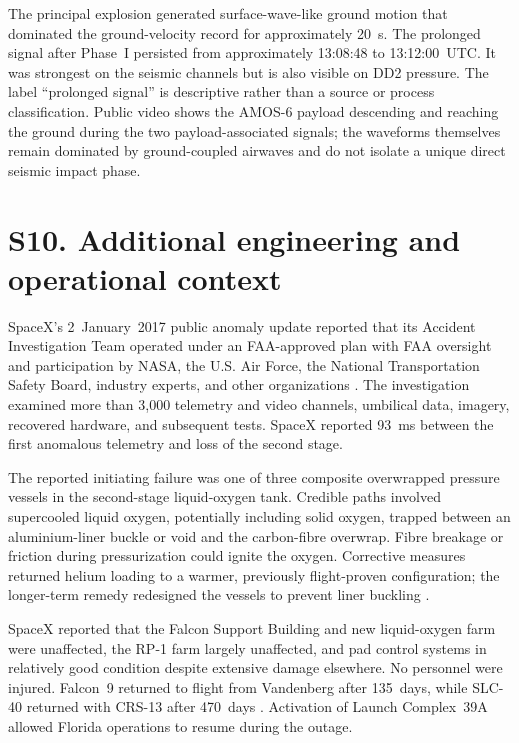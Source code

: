 \documentclass[]{seismica}
\begin{document}
The principal explosion generated surface-wave-like ground motion that
dominated the ground-velocity record for approximately 20~s. The prolonged
signal after Phase~I persisted from approximately 13:08:48 to
13:12:00~UTC. It was strongest on the seismic channels but is also visible on
DD2 pressure. The label ``prolonged signal'' is descriptive rather than a
source or process classification. Public video shows the AMOS-6 payload
descending and reaching the ground during the two payload-associated signals;
the waveforms themselves remain dominated by ground-coupled airwaves and do
not isolate a unique direct seismic impact phase.

\FloatBarrier


\section*{S10. Additional engineering and operational context}
\label{sec:supp_engineering}

SpaceX's 2~January~2017 public anomaly update reported that its Accident
Investigation Team operated under an FAA-approved plan with FAA oversight and
participation by NASA, the U.S. Air Force, the National Transportation Safety
Board, industry experts, and other organizations
\citep{spacex_anomaly_2017,nasa_sma_falcon9}. The investigation examined more
than 3,000 telemetry and video channels, umbilical data, imagery, recovered
hardware, and subsequent tests. SpaceX reported 93~ms between the first
anomalous telemetry and loss of the second stage.

The reported initiating failure was one of three composite overwrapped pressure
vessels in the second-stage liquid-oxygen tank. Credible paths involved
supercooled liquid oxygen, potentially including solid oxygen, trapped between
an aluminium-liner buckle or void and the carbon-fibre overwrap. Fibre breakage
or friction during pressurization could ignite the oxygen. Corrective measures
returned helium loading to a warmer, previously flight-proven configuration;
the longer-term remedy redesigned the vessels to prevent liner buckling
\citep{spacex_anomaly_2017}.

SpaceX reported that the Falcon Support Building and new liquid-oxygen farm
were unaffected, the RP-1 farm largely unaffected, and pad control systems in
relatively good condition despite extensive damage elsewhere. No personnel
were injured. Falcon~9 returned to flight from Vandenberg after 135~days, while
SLC-40 returned with CRS-13 after 470~days
\citep{spacex_iridium1_2017,spacex_crs13_2017}. Activation of Launch
Complex~39A allowed Florida operations to resume during the outage.
\end{document}

